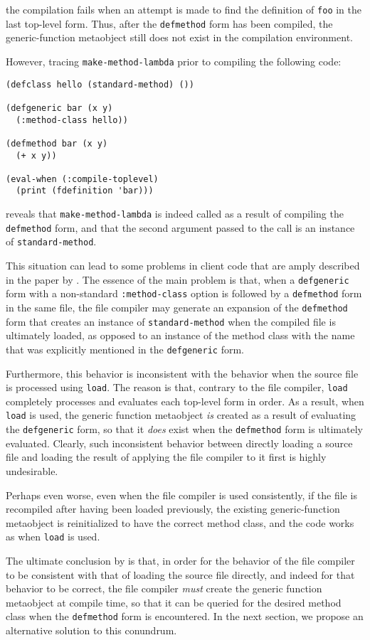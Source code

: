 \noindent
the compilation fails when an attempt is made to find the definition
of \texttt{foo} in the last top-level form.  Thus, after the
\texttt{defmethod} form has been compiled, the generic-function
metaobject still does not exist in the compilation environment.

However, tracing \texttt{make-method-lambda} prior to compiling the
following code:

\begin{verbatim}
(defclass hello (standard-method) ())

(defgeneric bar (x y)
  (:method-class hello))

(defmethod bar (x y)
  (+ x y))

(eval-when (:compile-toplevel)
  (print (fdefinition 'bar)))
\end{verbatim}

\noindent
reveals that \texttt{make-method-lambda} is indeed called as a result
of compiling the \texttt{defmethod} form, and that the second argument
passed to the call is an instance of \texttt{standard-method}.

This situation can lead to some problems in client code that are amply
described in the paper by \cnh{}.  The essence of the
main problem is that, when a \texttt{defgeneric} form with a
non-standard \texttt{:method-class} option is followed by a
\texttt{defmethod} form in the same file, the file compiler may
generate an expansion of the \texttt{defmethod} form that creates an
instance of \texttt{standard-method} when the compiled file is
ultimately loaded, as opposed to an instance of the method class with
the name that was explicitly mentioned in the \texttt{defgeneric}
form.

Furthermore, this behavior is inconsistent with the behavior when the
source file is processed using \texttt{load}.  The reason is that,
contrary to the file compiler, \texttt{load} completely processes and
evaluates each top-level form in order.  As a result, when
\texttt{load} is used, the generic function metaobject \emph{is}
created as a result of evaluating the \texttt{defgeneric} form, so
that it \emph{does} exist when the \texttt{defmethod} form is
ultimately evaluated.  Clearly, such inconsistent behavior between
directly loading a source file and loading the result of applying the
file compiler to it first is highly undesirable.

Perhaps even worse, even when the file compiler is used consistently,
if the file is recompiled after having been loaded previously, the
existing generic-function metaobject is reinitialized to have the
correct method class, and the code works as when \texttt{load} is
used.

The ultimate conclusion by \cnh{} is that, in order for
the behavior of the file compiler to be consistent with that of
loading the source file directly, and indeed for that behavior to be
correct, the file compiler \emph{must} create the generic function
metaobject at compile time, so that it can be queried for the desired
method class when the \texttt{defmethod} form is encountered.  In the
next section, we propose an alternative solution to this conundrum.

